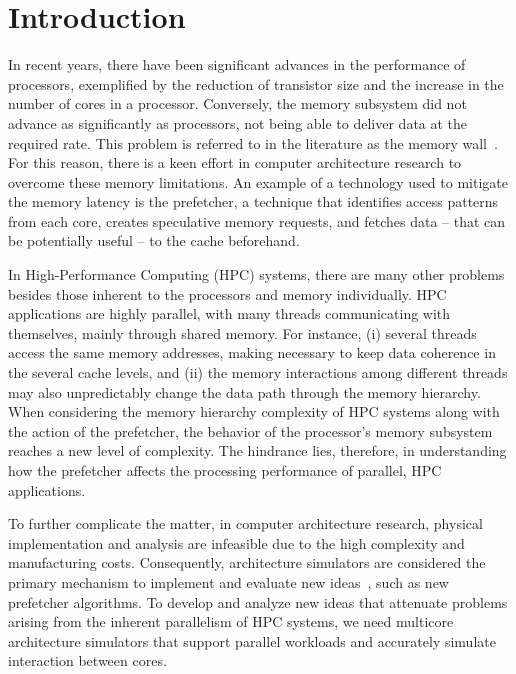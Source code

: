 \documentclass[AMA,final,STIX1COL]{WileyNJD-v2}
\begin{document}
\maketitle

\section{Introduction}\label{sec:introduction}

In recent years, there have been significant advances in the performance of processors, exemplified by the reduction of transistor size and the increase in the number of cores in a processor.
Conversely, the memory subsystem did not advance as significantly as processors, not being able to deliver data at the required rate. 
This problem is referred to in the literature as the memory wall~\cite{wulf1995memory}.
For this reason, there is a keen effort in computer architecture research to overcome these memory limitations. 
An example of a technology used to mitigate the memory latency is the prefetcher, a technique that identifies access patterns from each core, creates speculative memory requests, and fetches data -- that can be potentially useful -- to the cache beforehand.

In High-Performance Computing (HPC) systems, there are many other problems besides those inherent to the processors and memory individually. 
HPC applications are highly parallel, with many threads communicating with themselves, mainly through shared memory. For instance, (i) several threads access the same memory addresses, making necessary to keep data coherence in the several cache levels, and (ii) the memory interactions among different threads may also unpredictably change the data path through the memory hierarchy. 
When considering the memory hierarchy complexity of HPC systems along with the action of the prefetcher, the behavior of the processor's memory subsystem reaches a new level of complexity. 
The hindrance lies, therefore, in understanding how the prefetcher affects the processing performance of parallel, HPC applications.

To further complicate the matter, in computer architecture research, physical implementation and analysis are infeasible due to the high complexity and manufacturing costs. 
Consequently, architecture simulators are considered the primary mechanism to implement and evaluate new ideas~\cite{skadron2003challenges}, such as new prefetcher algorithms. 
To develop and analyze new ideas that attenuate problems arising from the inherent parallelism of HPC systems, we need multicore architecture simulators that support parallel workloads and accurately simulate interaction between cores.
\end{document}
